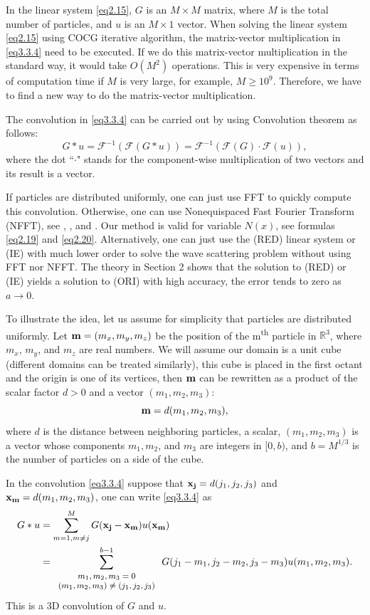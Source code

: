 \documentclass{wap}
\newcommand{\be}{\begin{equation}}
\newcommand{\ee}{\end{equation}}
\newcommand{\RRR}{\mathbb{R}^3}
\begin{document}
In the linear system \eqref{eq2.15}, $G$ is an $M\times M$ matrix, where $M$ is the total number of particles, and $u$ is an $M \times 1$ vector. When solving the linear system \eqref{eq2.15} using COCG iterative algorithm, the matrix-vector multiplication in \eqref{eq3.3.4} need to be executed. If we do this matrix-vector multiplication in the standard way, it would take $O(M^2)$ operations. This is very expensive in terms of computation time if $M$ is very large, for example,  $M \ge 10^{9}$. Therefore, we have to find a new way to do the matrix-vector multiplication.

The convolution in \eqref{eq3.3.4} can be carried out by using Convolution theorem as follows:
\be \label{eq3.3.8}
	G*u=\mathcal{F}^{-1}(\mathcal{F}(G*u))=\mathcal{F}^{-1}(\mathcal{F}(G)\cdot \mathcal{F}(u)),
\ee
where the dot ``$\cdot$" stands for the component-wise multiplication of two vectors and its result is a vector.

If particles are distributed uniformly, one can just use FFT to quickly compute this convolution. Otherwise, one can use Nonequispaced Fast Fourier Transform (NFFT), see \cite{NFFT}, \cite{KKP2009}, and \cite{PP2013}. Our method is valid for variable $N(x)$, see formulas \eqref{eq2.19} and \eqref{eq2.20}. Alternatively, one can just use the (RED) linear system or (IE) with much lower order to solve the wave scattering problem without using FFT nor NFFT. The theory in Section 2 shows that the solution to (RED) or (IE) yields a solution to (ORI) with high accuracy, the error tends to zero as $a \to 0$.

To illustrate the idea, let us assume for simplicity that particles are distributed uniformly.
Let $\bold{m}=(m_x,m_y,m_z)$ be the position of the m\textsuperscript{th} particle in $\RRR$, where $m_x$, $m_y$, and $m_z$ are real numbers. We will assume our domain is a unit cube (different domains can be treated similarly),  this cube is placed in the first octant and the origin is one of its vertices, then $\bold{m}$ can be rewritten as a product of the scalar factor $d>0$ and a vector $(m_1, m_2, m_3)$:
\be \label{eq3.3.5}
	\bold{m}=d(m_1,m_2,m_3),
\ee
where $d$ is the distance between neighboring particles, a scalar,  $(m_1,m_2,m_3)$ is a vector whose components $m_1, m_2$, and $m_3$ are integers in $[0,b)$, and $b=M^{1/3}$ is the number of particles on a side of the cube.

In the convolution \eqref{eq3.3.4} suppose that $\bold{x_j}=d(j_1,j_2,j_3)$ and $\bold{x_m}=d(m_1,m_2,m_3)$, one can write \eqref{eq3.3.4} as
\begin{align}
	G*u &= \sum_{m=1, m \ne j}^M  G(\bold{x_j}-\bold{x_m})u(\bold{x_m})  \label{eq3.3.6} \\
		&= \sum_{{\footnotesize \begin{array}{c}
			m_1,m_2,m_3=0 \\
			(m_1,m_2,m_3) \ne (j_1,j_2,j_3)
		\end{array}}}^{b-1}
		G(j_1-m_1,j_2-m_2, j_3-m_3)u(m_1,m_2,m_3).  \label{eq3.3.7}
\end{align}
This is a 3D convolution of $G$ and $u$.
\end{document}
